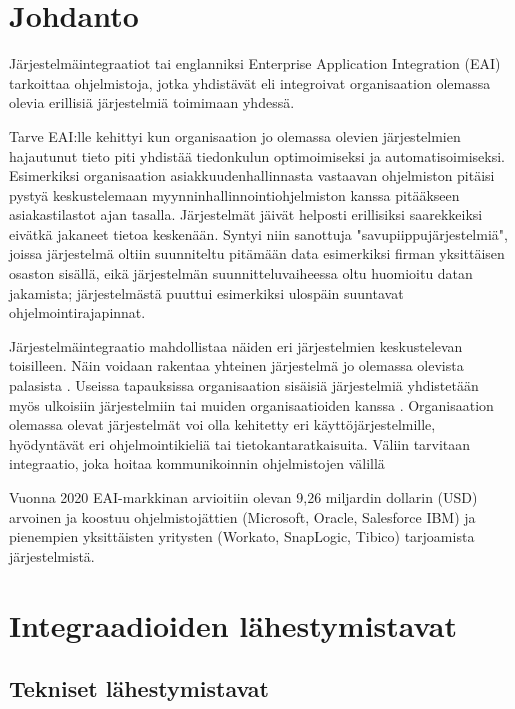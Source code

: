 
\chapter{Johdanto}


Järjestelmäintegraatiot tai englanniksi Enterprise Application Integration (EAI) tarkoittaa ohjelmistoja, 
jotka yhdistävät eli integroivat organisaation olemassa olevia erillisiä järjestelmiä toimimaan yhdessä.

Tarve EAI:lle kehittyi kun organisaation jo olemassa olevien
järjestelmien hajautunut tieto piti yhdistää tiedonkulun optimoimiseksi ja
automatisoimiseksi. Esimerkiksi organisaation asiakkuudenhallinnasta vastaavan ohjelmiston
pitäisi pystyä keskustelemaan myynninhallinnointiohjelmiston kanssa pitääkseen
asiakastilastot ajan tasalla. 
Järjestelmät jäivät helposti erillisiksi saarekkeiksi eivätkä jakaneet tietoa keskenään. 
Syntyi niin sanottuja "savupiippujärjestelmiä", joissa järjestelmä oltiin suunniteltu pitämään data esimerkiksi firman yksittäisen osaston sisällä, eikä järjestelmän suunnitteluvaiheessa oltu huomioitu datan jakamista; järjestelmästä puuttui esimerkiksi ulospäin suuntavat ohjelmointirajapinnat. 

Järjestelmäintegraatio mahdollistaa näiden eri järjestelmien keskustelevan toisilleen. Näin voidaan rakentaa yhteinen järjestelmä jo olemassa olevista palasista \citep[sivu 15]{linthicum2000enterprise}. Useissa tapauksissa organisaation sisäisiä järjestelmiä yhdistetään myös ulkoisiin järjestelmiin tai muiden organisaatioiden kanssa \citep{Johannesson2001}.
Organisaation olemassa olevat järjestelmät voi olla kehitetty eri käyttöjärjestelmille, hyödyntävät eri
ohjelmointikieliä tai tietokantaratkaisuita. Väliin tarvitaan integraatio, joka hoitaa
kommunikoinnin ohjelmistojen välillä


Vuonna 2020 EAI-markkinan arvioitiin olevan 9,26 miljardin dollarin (USD) arvoinen \citep{mordorintelligence} ja koostuu ohjelmistojättien (Microsoft, Oracle, Salesforce IBM) ja pienempien yksittäisten yritysten (Workato, SnapLogic, Tibico) tarjoamista järjestelmistä.


\chapter{Integraadioiden lähestymistavat}

\section{Tekniset lähestymistavat}

